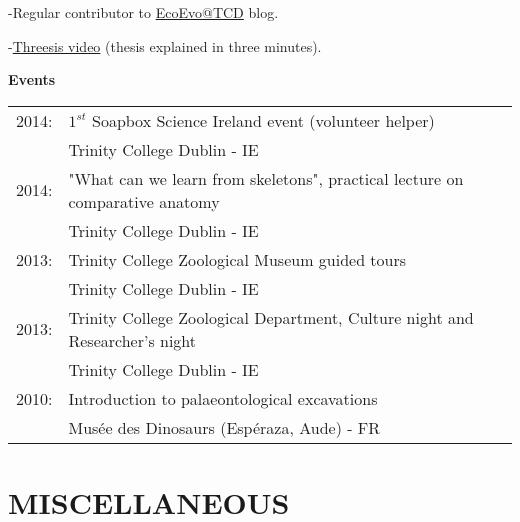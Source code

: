 \documentclass[10pt,a4paper]{article}
\begin{document}
{-Regular contributor to \href{http://www.ecoevoblog.com/}{EcoEvo@TCD} blog.

-\href{http://www.youtube.com/watch?v=Y3ciaYSvbyU}{Threesis video} (thesis explained in three minutes).
\bigskip

\raggedright\textbf{Events}\\[1.5ex]
\begin{tabular}{ll}
2014: & $1^{st}$ Soapbox Science Ireland event (volunteer helper)\\
& Trinity College Dublin - IE\\
2014: & "What can we learn from skeletons", practical lecture on comparative anatomy \\
& Trinity College Dublin - IE \\
2013: & Trinity College Zoological Museum guided tours\\
& Trinity College Dublin - IE\\
2013: & Trinity College Zoological Department, Culture night and Researcher's night\\
& Trinity College Dublin - IE\\
2010: & Introduction to palaeontological excavations\\
& Mus\'{e}e des Dinosaurs (Esp\'{e}raza, Aude) - FR\\
\end{tabular}
\bigskip

\section{MISCELLANEOUS}
\bigskip

}
\end{document}
